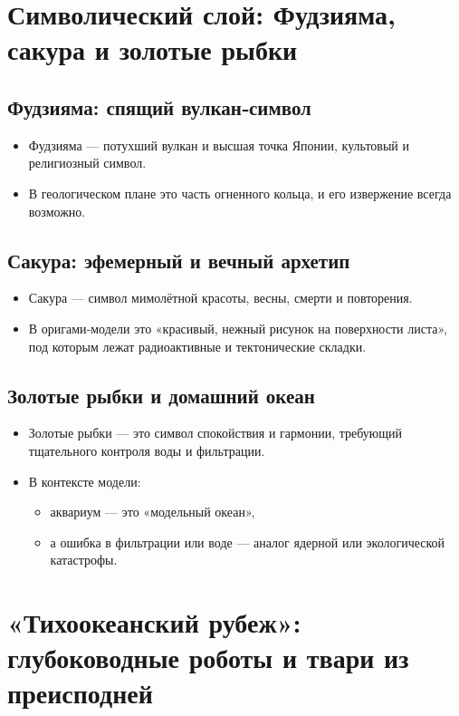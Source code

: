 \documentclass[12pt]{article}
\begin{document}
\section{Символический слой: Фудзияма, сакура и золотые рыбки}

\subsection{Фудзияма: спящий вулкан‑символ}

\begin{itemize}
  \item Фудзияма — потухший вулкан и высшая точка Японии, культовый и религиозный символ.
  \item В геологическом плане это часть огненного кольца, и его извержение всегда возможно.
\end{itemize}

\subsection{Сакура: эфемерный и вечный архетип}

\begin{itemize}
  \item Сакура — символ мимолётной красоты, весны, смерти и повторения.
  \item В оригами‑модели это «красивый, нежный рисунок на поверхности листа», под которым лежат радиоактивные и тектонические складки.
\end{itemize}

\subsection{Золотые рыбки и домашний океан}

\begin{itemize}
  \item Золотые рыбки — это символ спокойствия и гармонии, требующий тщательного контроля воды и фильтрации.
  \item В контексте модели:
    \begin{itemize}
      \item аквариум — это «модельный океан»,
      \item а ошибка в фильтрации или воде — аналог ядерной или экологической катастрофы.
    \end{itemize}
\end{itemize}

\section{«Тихоокеанский рубеж»: глубоководные роботы и твари из преисподней}
\end{document}
